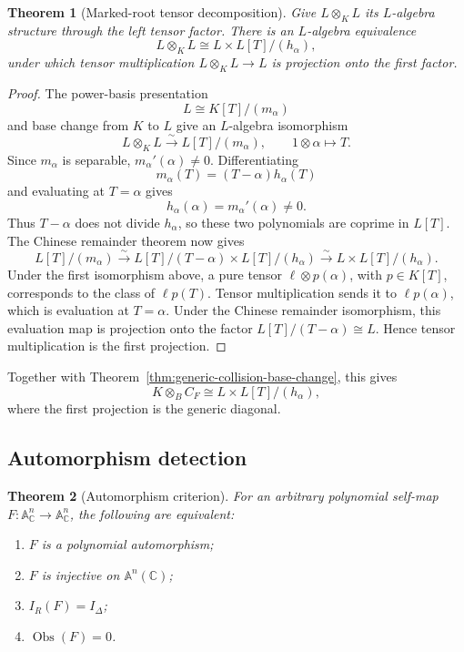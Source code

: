 \documentclass[11pt]{article}
\newtheorem{theorem}{Theorem}[section]
\theoremstyle{remark}
\theoremstyle{definition}
\newcommand{\A}{\mathbb A}
\newcommand{\C}{\mathbb C}
\newcommand{\Obs}{\operatorname{Obs}}
\begin{document}
\begin{theorem}[Marked-root tensor decomposition]
\label{thm:marked-root-tensor-decomposition}
Give \(L\otimes_KL\) its \(L\)-algebra structure through the left tensor
factor.  There is an \(L\)-algebra equivalence
\[
  L\otimes_KL
  \cong
  L\times L[T]/(h_\alpha),
\]
under which tensor multiplication \(L\otimes_KL\to L\) is projection
onto the first factor.
\end{theorem}

\begin{proof}
The power-basis presentation
\[
  L\cong K[T]/(m_\alpha)
\]
and base change from \(K\) to \(L\) give an \(L\)-algebra isomorphism
\[
  L\otimes_KL
  \xrightarrow{\sim}
  L[T]/(m_\alpha),
  \qquad
  1\otimes\alpha\longmapsto T.
\]
Since \(m_\alpha\) is separable,
\(m_\alpha'(\alpha)\neq0\).  Differentiating
\[
  m_\alpha(T)=(T-\alpha)h_\alpha(T)
\]
and evaluating at \(T=\alpha\) gives
\[
  h_\alpha(\alpha)=m_\alpha'(\alpha)\neq0.
\]
Thus \(T-\alpha\) does not divide \(h_\alpha\), so these two polynomials
are coprime in \(L[T]\).  The Chinese remainder theorem now gives
\[
  L[T]/(m_\alpha)
  \xrightarrow{\sim}
  L[T]/(T-\alpha)\times L[T]/(h_\alpha)
  \xrightarrow{\sim}
  L\times L[T]/(h_\alpha).
\]
Under the first isomorphism above, a pure tensor
\(\ell\otimes p(\alpha)\), with \(p\in K[T]\), corresponds to the class
of \(\ell p(T)\).  Tensor multiplication sends it to
\(\ell p(\alpha)\), which is evaluation at \(T=\alpha\).  Under the
Chinese remainder isomorphism, this evaluation map is projection onto
the factor \(L[T]/(T-\alpha)\cong L\).  Hence tensor multiplication is
the first projection.
\end{proof}

Together with Theorem~\ref{thm:generic-collision-base-change}, this gives
\[
  K\otimes_BC_F
  \cong
  L\times L[T]/(h_\alpha),
\]
where the first projection is the generic diagonal.

\subsection{Automorphism detection}
\label{sec:automorphism-detection}

\begin{theorem}[Automorphism criterion]
\label{thm:automorphism-criterion}
For an arbitrary polynomial self-map
\(F\colon\A^n_{\C}\to\A^n_{\C}\), the following are equivalent:
\begin{enumerate}[label=\textup{(\arabic*)}]
  \item \(F\) is a polynomial automorphism;
  \item \(F\) is injective on \(\A^n(\C)\);
  \item \(I_R(F)=I_\Delta\);
  \item \(\Obs(F)=0\).
\end{enumerate}
\end{theorem}
\end{document}
